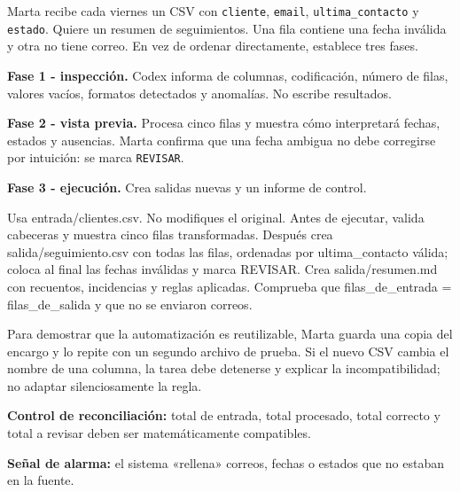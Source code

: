 \documentclass[10pt,a4paper,openany]{book}
\newenvironment{Shaded}{}{}
\newcommand{\NormalTok}[1]{#1}
\renewenvironment{Shaded}
  {\begin{tcolorbox}[
    enhanced,
    breakable,
    colback=CodeBg,
    colframe=Border,
    boxrule=0.5pt,
    arc=2mm,
    left=3mm,
    right=3mm,
    top=2.2mm,
    bottom=2.2mm,
    before skip=0.8em,
    after skip=0.9em
  ]}
  {\end{tcolorbox}}
\begin{document}
Marta recibe cada viernes un CSV con \texttt{cliente}, \texttt{email},
\texttt{ultima\_contacto} y \texttt{estado}. Quiere un resumen de
seguimientos. Una fila contiene una fecha inválida y otra no tiene
correo. En vez de ordenar directamente, establece tres fases.

\textbf{Fase 1 - inspección.} Codex informa de columnas, codificación,
número de filas, valores vacíos, formatos detectados y anomalías. No
escribe resultados.

\textbf{Fase 2 - vista previa.} Procesa cinco filas y muestra cómo
interpretará fechas, estados y ausencias. Marta confirma que una fecha
ambigua no debe corregirse por intuición: se marca \texttt{REVISAR}.

\textbf{Fase 3 - ejecución.} Crea salidas nuevas y un informe de
control.

\begin{Shaded}
\begin{Highlighting}[]
\NormalTok{Usa entrada/clientes.csv. No modifiques el original.}
\NormalTok{Antes de ejecutar, valida cabeceras y muestra cinco filas transformadas.}
\NormalTok{Después crea salida/seguimiento.csv con todas las filas, ordenadas por}
\NormalTok{ultima\_contacto válida; coloca al final las fechas inválidas y marca REVISAR.}
\NormalTok{Crea salida/resumen.md con recuentos, incidencias y reglas aplicadas.}
\NormalTok{Comprueba que filas\_de\_entrada = filas\_de\_salida y que no se enviaron correos.}
\end{Highlighting}
\end{Shaded}

Para demostrar que la automatización es reutilizable, Marta guarda una
copia del encargo y lo repite con un segundo archivo de prueba. Si el
nuevo CSV cambia el nombre de una columna, la tarea debe detenerse y
explicar la incompatibilidad; no adaptar silenciosamente la regla.

\begin{tipbox}

\textbf{Control de reconciliación:} total de entrada, total procesado,
total correcto y total a revisar deben ser matemáticamente compatibles.

\end{tipbox}

\begin{warningbox}

\textbf{Señal de alarma:} el sistema «rellena» correos, fechas o estados
que no estaban en la fuente.

\end{warningbox}
\end{document}

